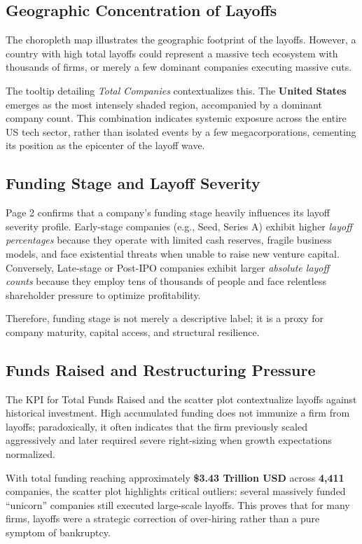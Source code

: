 \documentclass[a4paper,12pt]{article}
\begin{document}
\subsection{Geographic Concentration of Layoffs}
The choropleth map illustrates the geographic footprint of the layoffs. However, a country with high total layoffs could represent a massive tech ecosystem with thousands of firms, or merely a few dominant companies executing massive cuts.

The tooltip detailing \textit{Total Companies} contextualizes this. The \textbf{United States} emerges as the most intensely shaded region, accompanied by a dominant company count. This combination indicates systemic exposure across the entire US tech sector, rather than isolated events by a few megacorporations, cementing its position as the epicenter of the layoff wave.

\subsection{Funding Stage and Layoff Severity}
Page 2 confirms that a company's funding stage heavily influences its layoff severity profile. Early-stage companies (e.g., Seed, Series A) exhibit higher \textit{layoff percentages} because they operate with limited cash reserves, fragile business models, and face existential threats when unable to raise new venture capital. Conversely, Late-stage or Post-IPO companies exhibit larger \textit{absolute layoff counts} because they employ tens of thousands of people and face relentless shareholder pressure to optimize profitability.

Therefore, funding stage is not merely a descriptive label; it is a proxy for company maturity, capital access, and structural resilience.

\subsection{Funds Raised and Restructuring Pressure}
The KPI for Total Funds Raised and the scatter plot contextualize layoffs against historical investment. High accumulated funding does not immunize a firm from layoffs; paradoxically, it often indicates that the firm previously scaled aggressively and later required severe right-sizing when growth expectations normalized.

With total funding reaching approximately \textbf{\$3.43 Trillion USD} across \textbf{4,411} companies, the scatter plot highlights critical outliers: several massively funded ``unicorn'' companies still executed large-scale layoffs. This proves that for many firms, layoffs were a strategic correction of over-hiring rather than a pure symptom of bankruptcy.
\end{document}
